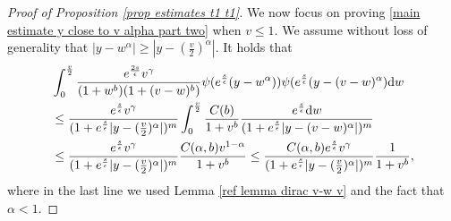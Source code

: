 \documentclass[11pt]{article}
\numberwithin{equation}{section}
\newcommand{\der}{\textup{d}}
\begin{document}
\begin{proof}[Proof of Proposition 
\ref{prop estimates t1 t1}]
We now focus on proving \eqref{main estimate y close to v alpha part two} when $v\leq 1$. We assume without loss of generality that $|y-w^{\alpha}|\geq |y-(\frac{v}{2})^{\alpha}|$. It holds that
\begin{align*}
&\int_{0}^{\frac{v}{2}}\frac{e^{\frac{2s}{\epsilon}}v^{\gamma}}{(1+w^{b})(1+(v-w)^{b})}\psi(e^{\frac{s}{\epsilon}}(y-w^{\alpha}))\psi(e^{\frac{s}{\epsilon}}(y-(v-w)^{\alpha})\der w\\
&\leq  \frac{e^{\frac{s}{\epsilon}}v^{\gamma}}{(1+e^{\frac{s}{\epsilon}}|y-(\frac{v}{2})^{\alpha}|)^{m}}\int_{0}^{\frac{v}{2}}\frac{C(b)}{1+v^{b}}\frac{e^{\frac{s}{\epsilon}}\der w}{(1+e^{\frac{s}{\epsilon}}|y-(v-w)^{\alpha}|)^{m}}\\
&\leq \frac{e^{\frac{s}{\epsilon}}v^{\gamma}}{(1+e^{\frac{s}{\epsilon}}|y-(\frac{v}{2})^{\alpha}|)^{m}}\frac{C(\alpha,b) v^{1-\alpha}}{1+v^{b}}\leq  \frac{C(\alpha,b) e^{\frac{s}{\epsilon}}v^{\gamma}}{(1+e^{\frac{s}{\epsilon}}|y-(\frac{v}{2})^{\alpha}|)^{m}}\frac{1}{1+v^{b}},
\end{align*}
where in the last line we used Lemma \ref{ref lemma dirac v-w v} and the fact that $\alpha<1$.



  
 
  \end{proof}
\end{document}
